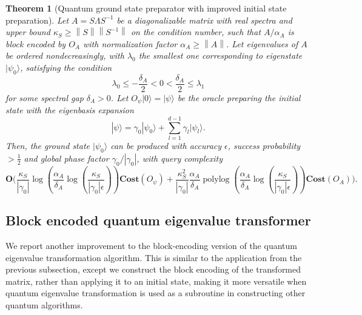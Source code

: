\documentclass[letterpaper,onecolumn,11pt,accepted=2026-02-14]{quantumarticle}
\newcommand{\abs}[1]{\left\lvert#1\right\rvert}
\newcommand{\norm}[1]{\left\lVert#1\right\rVert}
\DeclareMathOperator{\polylog}{polylog}
\newtheorem{theorem}{Theorem}
\theoremstyle{remark}
\theoremstyle{plain}
\newcommand{\ket}[1]{|#1\rangle}
\begin{document}
\begin{theorem}[Quantum ground state preparator with improved initial state preparation]
\label{thm:gs_init}
Let $A=S\Lambda S^{-1}$ be a diagonalizable matrix with real spectra and upper bound $\kappa_S\geq\norm{S}\norm{S^{-1}}$ on the condition number, such that $A/\alpha_A$ is block encoded by $O_A$ with normalization factor $\alpha_A\geq\norm{A}$.
Let eigenvalues of $A$ be ordered nondecreasingly, with $\lambda_0$ the smallest one corresponding to eigenstate $\ket{\psi_0}$, satisfying the condition
    \begin{equation}
        \lambda_0\leq-\frac{\delta_A}{2}<0<\frac{\delta_A}{2}\leq\lambda_1
    \end{equation}
    for some spectral gap $\delta_A>0$. 
Let $O_\psi\ket{0}=\ket{\psi}$ be the oracle preparing the initial state with the eigenbasis expansion
    \begin{equation}
        \ket{\psi}=\gamma_0\ket{\psi_0}+\sum_{l=1}^{d-1}\gamma_l\ket{\psi_l}.
    \end{equation}
Then, the ground state $\ket{\psi_0}$ can be produced with accuracy $\epsilon$, success probability $>\frac{1}{2}$ and global phase factor $\gamma_0/\abs{\gamma_0}$, with query complexity
\begin{equation}
    \mathbf{O}\Bigg(
    \frac{\kappa_S}{|\gamma_0|}\log\left(\frac{\alpha_A}{\delta_A}
        \log\left(\frac{\kappa_S}{|\gamma_0|\epsilon}\right)\right)
    \mathbf{Cost}\left(O_{\psi}\right)
    +\frac{\kappa_S^2}{|\gamma_0|}
    \frac{\alpha_A}{\delta_A}
    \polylog\left(\frac{\alpha_A}{\delta_A}
        \log\left(\frac{\kappa_S}{|\gamma_0|\epsilon}\right)\right)
    \mathbf{Cost}\left(O_{A}\right)\Bigg).
\end{equation}
\end{theorem}


\subsection{Block encoded quantum eigenvalue transformer}
\label{sec:precond_transform_blk}
We report another improvement to the block-encoding version of the quantum eigenvalue transformation algorithm. This is similar to the application from the previous subsection, except we construct the block encoding of the transformed matrix, rather than applying it to an initial state, making it more versatile when quantum eigenvalue transformation is used as a subroutine in constructing other quantum algorithms.
\end{document}
